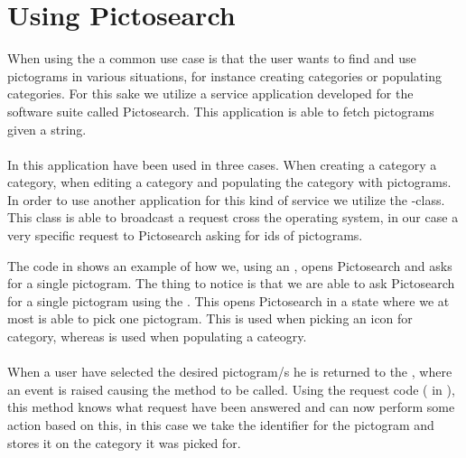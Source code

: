 
\section{Using Pictosearch}
\label{sec:using_pictosearch}


When using the \ct a common use case is that the user wants to find and use pictograms in various situations, for instance creating categories or populating categories. For this sake we utilize a service application developed for the \giraf software suite called Pictosearch. This application is able to fetch pictograms given a string. 
\\\\
In \ct this application have been used in three cases. When creating a category a category, when editing a category and populating the category with pictograms. In order to use another application for this kind of service we utilize the -class. This class is able to broadcast a request cross the operating system, in our case a very specific request to Pictosearch asking for ids of pictograms. 



The code in  shows an example of how we, using an , opens Pictosearch and asks for a single pictogram. The thing to notice is that we are able to ask Pictosearch for a single pictogram using the . This opens Pictosearch in a state where we at most is able to pick one pictogram. This is used when picking an icon for category, whereas  is used when populating a cateogry. 
\\\\
When a user have selected the desired pictogram/s he is returned to the \ct, where an event is raised causing the method  to be called. Using the request code ( in ), this method knows what request have been answered and can now perform some action based on this, in this case we take the identifier for the pictogram and stores it on the category it was picked for.

